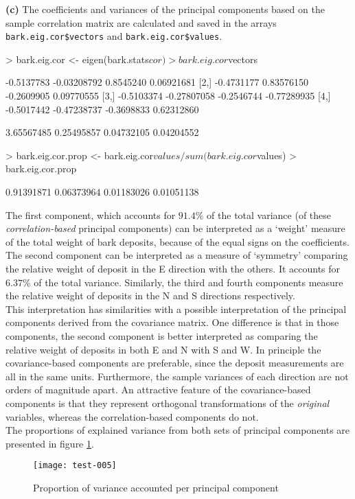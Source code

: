 \documentclass[a4paper,11pt]{article}
\begin{document}
{\bf (c)} The coefficients and variances of the principal components based on the sample correlation matrix are calculated and saved in the arrays \texttt{bark.eig.cor\$vectors} and \texttt{bark.eig.cor\$values}.
\begin{Schunk}
\begin{Sinput}
> bark.eig.cor <- eigen(bark.stats$cor)
> bark.eig.cor$vectors
\end{Sinput}
\begin{Soutput}
           [,1]        [,2]       [,3]        [,4]
[1,] -0.5137783 -0.03208792  0.8545240  0.06921681
[2,] -0.4731177  0.83576150 -0.2609905  0.09770555
[3,] -0.5103374 -0.27807058 -0.2546744 -0.77289935
[4,] -0.5017442 -0.47238737 -0.3698833  0.62312860
\end{Soutput}
\begin{Soutput}
[1] 3.65567485 0.25495857 0.04732105 0.04204552
\end{Soutput}
\begin{Sinput}
> bark.eig.cor.prop <- bark.eig.cor$values/sum(bark.eig.cor$values)
> bark.eig.cor.prop
\end{Sinput}
\begin{Soutput}
[1] 0.91391871 0.06373964 0.01183026 0.01051138
\end{Soutput}
\end{Schunk}
The first component, which accounts for $
91.4
$\% of the total variance (of these {\em correlation-based} principal components) can be interpreted as a `weight' measure of the total weight of bark deposits, because of the equal signs on the coefficients. The second component can be interpreted as a measure of `symmetry' comparing the relative weight of deposit in the E direction with the others. It accounts for $
6.37
$\% of the total variance. Similarly, the third and fourth components measure the relative weight of deposits in the N and S directions respectively.\\
This interpretation has similarities with a possible interpretation of the principal components derived from the covariance matrix. One difference is that in those components, the second component is better interpreted as comparing the relative weight of deposits in both E and N with S and W. In principle the covariance-based components are preferable, since the deposit measurements are all in the same units. Furthermore, the sample variances of each direction are not orders of magnitude apart. An attractive feature of the covariance-based components is that they represent orthogonal transformations of the {\em original} variables, whereas the correlation-based components do not.\\
The proportions of explained variance from both sets of principal components are presented in figure \ref{fig:princomp}.
\begin{figure}[h]
\begin{centering}
\texttt{[image: test-005]}
\caption{Proportion of variance accounted per principal component}
\label{fig:princomp}
\end{centering}
\end{figure}
\\
\end{document}
